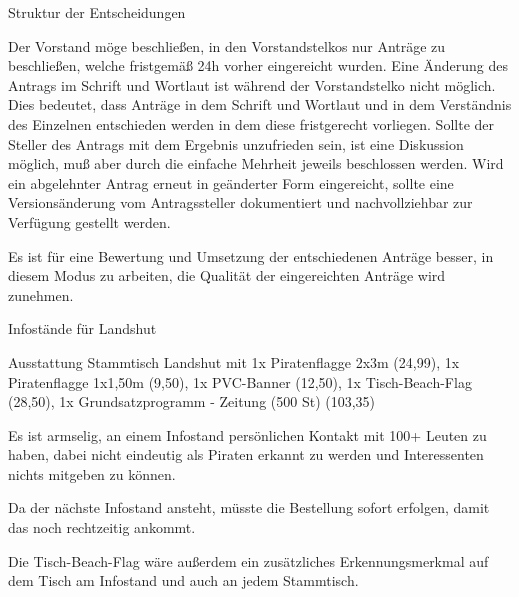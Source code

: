\documentclass{protokoll}
\begin{document}
\begin{Antrag}
        {Struktur der Entscheidungen}
        {}


\begin{Text}
Der Vorstand möge beschließen, in den Vorstandstelkos nur Anträge zu
beschließen, welche fristgemäß 24h vorher eingereicht wurden. Eine
Änderung des Antrags im Schrift und Wortlaut ist während der
Vorstandstelko nicht möglich.  Dies bedeutet, dass Anträge in dem
Schrift und Wortlaut und in dem Verständnis des Einzelnen entschieden
werden in dem diese fristgerecht vorliegen. Sollte der Steller des
Antrags mit dem Ergebnis unzufrieden sein, ist eine Diskussion
möglich, muß aber durch die einfache Mehrheit jeweils beschlossen
werden. Wird ein abgelehnter Antrag erneut in geänderter Form
eingereicht, sollte eine Versionsänderung vom Antragssteller
dokumentiert und nachvollziehbar zur Verfügung gestellt werden.
\end{Text}

\begin{Begründung}
Es ist für eine Bewertung und Umsetzung der entschiedenen Anträge
besser, in diesem Modus zu arbeiten, die Qualität der eingereichten
Anträge wird zunehmen.
\end{Begründung}


\end{Antrag}



\begin{Antrag}
        {Infostände für Landshut}
        {\abgelehnt}


\begin{Text}
Ausstattung Stammtisch Landshut mit 1x Piratenflagge 2x3m (24,99), 1x
Piratenflagge 1x1,50m (9,50), 1x PVC-Banner (12,50), 1x
Tisch-Beach-Flag (28,50), 1x Grundsatzprogramm - Zeitung (500 St)
(103,35)
\end{Text}

\begin{Begründung}
Es ist armselig, an einem Infostand persönlichen Kontakt mit 100+
Leuten zu haben, dabei nicht eindeutig als Piraten erkannt zu werden
und Interessenten nichts mitgeben zu können.

Da der nächste Infostand ansteht, müsste die Bestellung sofort
erfolgen, damit das noch rechtzeitig ankommt.

Die Tisch-Beach-Flag wäre außerdem ein zusätzliches Erkennungsmerkmal
auf dem Tisch am Infostand und auch an jedem Stammtisch.
\end{Begründung}


\end{Antrag}
\end{document}
